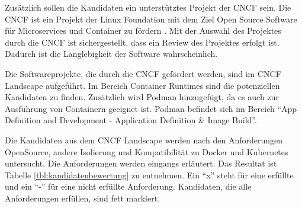 Zusätzlich sollen die Kandidaten ein unterstütztes Projekt der \ac{CNCF} sein. Die \ac{CNCF} ist ein Projekt der Linux Foundation mit dem Ziel Open Source Software für Microservices und Container zu fördern  \cite[vgl.][]{CloudNativeComputingFoundation.2020}. Mit der Auswahl des Projektes durch die \ac{CNCF} ist sichergestellt, dass ein Review des Projektes erfolgt ist. Dadurch ist die Langlebigkeit der Software wahrscheinlich. 

Die Softwareprojekte, die durch die \ac{CNCF} gefördert werden, sind im \ac{CNCF} Landscape \cite[vgl.][]{CNCF.20200220} aufgeführt. Im Bereich Container Runtimes sind die potenziellen Kandidaten zu finden. Zusätzlich wird Podman hinzugefügt, da es auch zur Ausführung von Containern geeignet ist. Podman befindet sich im Bereich "`App Definition and Development - Application Definition \& Image Build"'.

Die Kandidaten aus dem \ac{CNCF} Landscape werden nach den Anforderungen OpenSource, andere Isolierung und Kompatibilität zu Docker und Kubernetes untersucht. Die Anforderungen werden eingangs erläutert. Das Resultat ist Tabelle \ref{tbl:kandidatenbewertung} zu entnehmen. Ein "`x"' steht für eine erfüllte und ein "`-"' für eine nicht erfüllte Anforderung. Kandidaten, die alle Anforderungen erfüllen, sind fett markiert.

